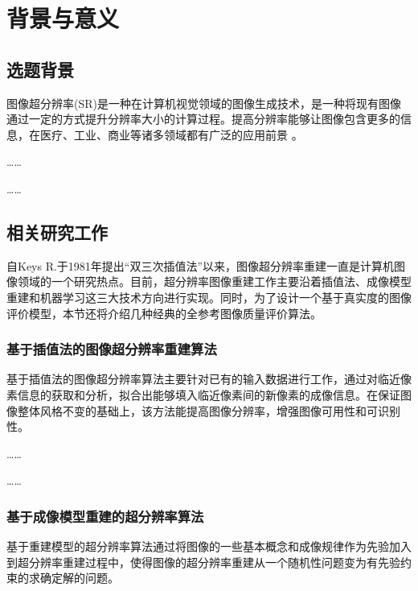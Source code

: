 
\chapter{背景与意义} 

\section{选题背景} 

图像超分辨率(SR)\cite{kim2010csmacdwithreservations,luguojun2019jiyumqtt}是一种在计算机视觉领域的图像生成技术，是一种将现有图像通过一定的方式提升分辨率大小的计算过程。提高分辨率能够让图像包含更多的信息，在医疗、工业、商业等诸多领域都有广泛的应用前景 。

……

……

\vspace*{\baselineskip}

\section{相关研究工作}

自Keys R.于1981年提出“双三次插值法”\cite{songqi2020huaweiharmonyos}以来，图像超分辨率重建一直是计算机图像领域的一个研究热点。目前，超分辨率图像重建工作主要沿着插值法、成像模型重建和机器学习这三大技术方向进行实现。同时，为了设计一个基于真实度的图像评价模型，本节还将介绍几种经典的全参考图像质量评价算法。

\subsection{基于插值法的图像超分辨率重建算法} 

基于插值法的图像超分辨率算法主要针对已有的输入数据进行工作，通过对临近像素信息的获取和分析，拟合出能够填入临近像素间的新像素的成像信息。在保证图像整体风格不变的基础上，该方法能提高图像分辨率，增强图像可用性和可识别性。

……

……

\vspace*{\baselineskip} 

\subsection{基于成像模型重建的超分辨率算法}

基于重建模型的超分辨率算法通过将图像的一些基本概念和成像规律作为先验加入到超分辨率重建过程中，使得图像的超分辨率重建从一个随机性问题变为有先验约束的求确定解的问题。

